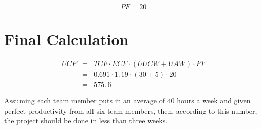 \documentclass{article}
\begin{document}
\[
PF=20 
\]

\bigskip

\section{Final Calculation}

\begin{eqnarray*}
UCP &=&TCF\cdot ECF\cdot \left( UUCW+UAW\right) \cdot PF \\
&=&\allowbreak 0.691\cdot \allowbreak 1.\,\allowbreak 19\cdot (30+5)\cdot 20
\\
&=&575.\,\allowbreak 6
\end{eqnarray*}

Assuming each team member puts in an average of 40 hours a week and given
perfect productivity from all six team members, then, according to this
number, the project should be done in less than three weeks.
\end{document}
